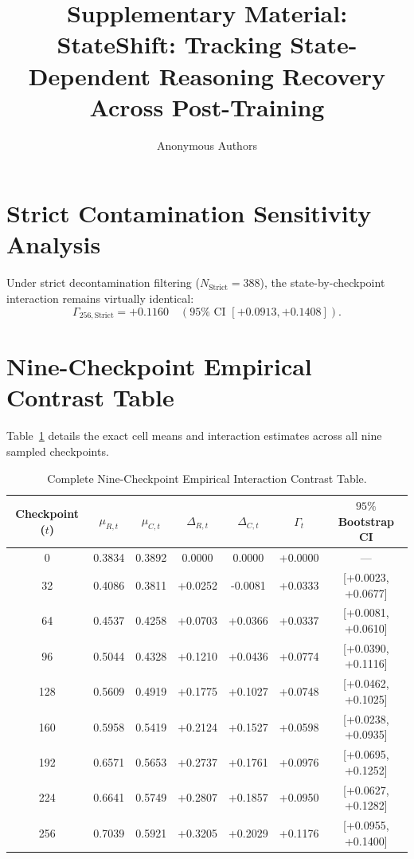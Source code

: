 \documentclass[11pt]{article}
\title{Supplementary Material: StateShift: Tracking State-Dependent Reasoning Recovery Across Post-Training}
\author{Anonymous Authors}
\date{}
\begin{document}
\maketitle

\section{Strict Contamination Sensitivity Analysis}
Under strict decontamination filtering ($N_{\text{Strict}} = 388$), the state-by-checkpoint interaction remains virtually identical:
\begin{equation}
\Gamma_{256,\text{Strict}} = +0.1160 \quad (95\% \text{ CI } [+0.0913, +0.1408]).
\end{equation}

\section{Nine-Checkpoint Empirical Contrast Table}
Table~\ref{tab:supp_trajectory} details the exact cell means and interaction estimates across all nine sampled checkpoints.

\begin{table}[h]
\centering
\caption{Complete Nine-Checkpoint Empirical Interaction Contrast Table.}
\label{tab:supp_trajectory}
\begin{tabular}{ccccccc}
\toprule
Checkpoint ($t$) & $\mu_{R,t}$ & $\mu_{C,t}$ & $\Delta_{R,t}$ & $\Delta_{C,t}$ & $\Gamma_t$ & $95\%$ Bootstrap CI \\
\midrule
0   & 0.3834 & 0.3892 & 0.0000 & 0.0000 & +0.0000 & --- \\
32  & 0.4086 & 0.3811 & +0.0252 & -0.0081 & +0.0333 & [+0.0023, +0.0677] \\
64  & 0.4537 & 0.4258 & +0.0703 & +0.0366 & +0.0337 & [+0.0081, +0.0610] \\
96  & 0.5044 & 0.4328 & +0.1210 & +0.0436 & +0.0774 & [+0.0390, +0.1116] \\
128 & 0.5609 & 0.4919 & +0.1775 & +0.1027 & +0.0748 & [+0.0462, +0.1025] \\
160 & 0.5958 & 0.5419 & +0.2124 & +0.1527 & +0.0598 & [+0.0238, +0.0935] \\
192 & 0.6571 & 0.5653 & +0.2737 & +0.1761 & +0.0976 & [+0.0695, +0.1252] \\
224 & 0.6641 & 0.5749 & +0.2807 & +0.1857 & +0.0950 & [+0.0627, +0.1282] \\
256 & 0.7039 & 0.5921 & +0.3205 & +0.2029 & +0.1176 & [+0.0955, +0.1400] \\
\bottomrule
\end{tabular}
\end{table}
\end{document}
